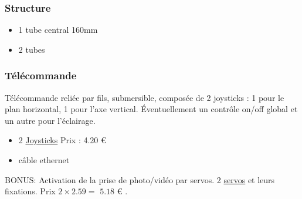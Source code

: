 \documentclass[11pt,a4paper]{article}
\newcommand{\PAYE}{{\Large\color{orange}\checkmark}}
\newcommand{\RECU}{{\Large\color{green}\checkmark}}
\begin{document}
        
        
        
        
      \subsubsection{Structure}
        \begin{itemize}
          \item 1 tube central 160mm
          \item 2 tubes 
        \end{itemize}

      
      \subsubsection{Télécommande  \PAYE}
        Télécommande reliée par fils, submersible, composée de 2 joysticks : 1 pour le plan horizontal, 1 pour l'axe vertical. Éventuellement un contrôle on/off global et un autre pour l'éclairage.\\
        \begin{itemize}
          \item 2 \href{http://www.ebay.co.uk/itm/Analogue-Joystick-Controller-5V-With-Click-Button-Arduino-PI-Compatible-/191608236635?}{Joysticks} Prix : {\color{red} 4.20 €} \PAYE
          \item câble ethernet \RECU
        \end{itemize}


        BONUS: Activation de la prise de photo/vidéo par servos. 2 \href{http://www.miniinthebox.com/fr/mini-servo-9g-avec-accessoires-bleu-translucide_p638990.html?litb_from=sysmail}{servos} et leurs fixations. Prix $2\times 2.59=$ {\color{red}$5.18$ €} \PAYE.
      
\end{document}
